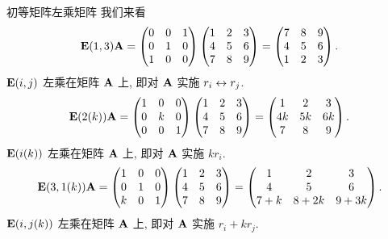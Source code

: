 \begin{frame}{初等矩阵左乘矩阵}
	\beqskip{1mm}
	\onslide<+->
	我们来看
	\[{\mathbf{E}}(1,3){\mathbf{A}}=\begin{pmatrix}
		0&0&1\\
		0&1&0\\
		1&0&0
	\end{pmatrix}\begin{pmatrix}
		1&2&3\\
		4&5&6\\
		7&8&9
	\end{pmatrix}=\begin{pmatrix}
		7&8&9\\
		4&5&6\\
		1&2&3
	\end{pmatrix}.\]
	\onslide<+->
	${\mathbf{E}}(i,j)$ 左乘在矩阵 ${\mathbf{A}}$ 上, 即对 ${\mathbf{A}}$ 实施 $r_i\leftrightarrow r_j$.	
	\onslide<+->
	\[{\mathbf{E}}(2(k)){\mathbf{A}}=\begin{pmatrix}
		1&0&0\\
		0&k&0\\
		0&0&1
	\end{pmatrix}\begin{pmatrix}
		1&2&3\\
		4&5&6\\
		7&8&9
	\end{pmatrix}=\begin{pmatrix}
		1&2&3\\
		4k&5k&6k\\
		7&8&9
	\end{pmatrix}.\]
	\onslide<+->
	${\mathbf{E}}(i(k))$ 左乘在矩阵 ${\mathbf{A}}$ 上, 即对 ${\mathbf{A}}$ 实施 $kr_i$.	
	\onslide<+->
	\[{\mathbf{E}}(3,1(k)){\mathbf{A}}=\begin{pmatrix}
		1&0&0\\
		0&1&0\\
		k&0&1
	\end{pmatrix}\begin{pmatrix}
		1&2&3\\
		4&5&6\\
		7&8&9
	\end{pmatrix}=\begin{pmatrix}
		1&2&3\\
		4&5&6\\
		7+k&8+2k&9+3k
	\end{pmatrix}.\]
	\onslide<+->
	${\mathbf{E}}(i,j(k))$ 左乘在矩阵 ${\mathbf{A}}$ 上, 即对 ${\mathbf{A}}$ 实施 $r_i+kr_j$.
	\endgroup
\end{frame}


